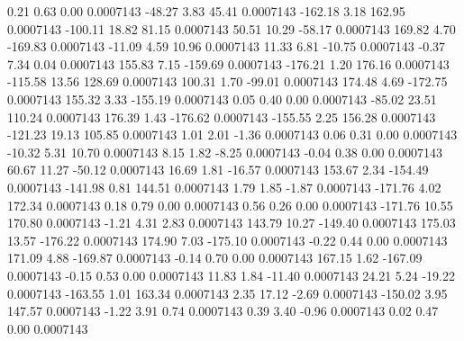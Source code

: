         0.21        0.63        0.00     0.0007143
      -48.27        3.83       45.41     0.0007143
     -162.18        3.18      162.95     0.0007143
     -100.11       18.82       81.15     0.0007143
       50.51       10.29      -58.17     0.0007143
      169.82        4.70     -169.83     0.0007143
      -11.09        4.59       10.96     0.0007143
       11.33        6.81      -10.75     0.0007143
       -0.37        7.34        0.04     0.0007143
      155.83        7.15     -159.69     0.0007143
     -176.21        1.20      176.16     0.0007143
     -115.58       13.56      128.69     0.0007143
      100.31        1.70      -99.01     0.0007143
      174.48        4.69     -172.75     0.0007143
      155.32        3.33     -155.19     0.0007143
        0.05        0.40        0.00     0.0007143
      -85.02       23.51      110.24     0.0007143
      176.39        1.43     -176.62     0.0007143
     -155.55        2.25      156.28     0.0007143
     -121.23       19.13      105.85     0.0007143
        1.01        2.01       -1.36     0.0007143
        0.06        0.31        0.00     0.0007143
      -10.32        5.31       10.70     0.0007143
        8.15        1.82       -8.25     0.0007143
       -0.04        0.38        0.00     0.0007143
       60.67       11.27      -50.12     0.0007143
       16.69        1.81      -16.57     0.0007143
      153.67        2.34     -154.49     0.0007143
     -141.98        0.81      144.51     0.0007143
        1.79        1.85       -1.87     0.0007143
     -171.76        4.02      172.34     0.0007143
        0.18        0.79        0.00     0.0007143
        0.56        0.26        0.00     0.0007143
     -171.76       10.55      170.80     0.0007143
       -1.21        4.31        2.83     0.0007143
      143.79       10.27     -149.40     0.0007143
      175.03       13.57     -176.22     0.0007143
      174.90        7.03     -175.10     0.0007143
       -0.22        0.44        0.00     0.0007143
      171.09        4.88     -169.87     0.0007143
       -0.14        0.70        0.00     0.0007143
      167.15        1.62     -167.09     0.0007143
       -0.15        0.53        0.00     0.0007143
       11.83        1.84      -11.40     0.0007143
       24.21        5.24      -19.22     0.0007143
     -163.55        1.01      163.34     0.0007143
        2.35       17.12       -2.69     0.0007143
     -150.02        3.95      147.57     0.0007143
       -1.22        3.91        0.74     0.0007143
        0.39        3.40       -0.96     0.0007143
        0.02        0.47        0.00     0.0007143
